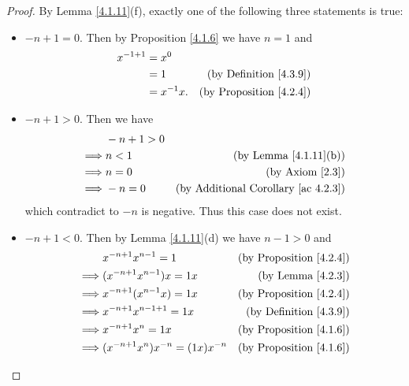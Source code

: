 \begin{proof}
    By Lemma \ref{4.1.11}(f), exactly one of the following three statements is true:
    \begin{itemize}
        \item \(-n + 1 = 0\).
              Then by Proposition \ref{4.1.6} we have \(n = 1\) and
              \begin{align*}
                  x^{-1 + 1} & = x^0                                             \\
                             & = 1         & \text{(by Definition \ref{4.3.9})}  \\
                             & = x^{-1} x. & \text{(by Proposition \ref{4.2.4})}
              \end{align*}
        \item \(-n + 1 > 0\).
              Then we have
              \begin{align*}
                           & -n + 1 > 0                                                   \\
                  \implies & n < 1      & \text{(by Lemma \ref{4.1.11}(b))}               \\
                  \implies & n = 0      & \text{(by Axiom \ref{2.3})}                     \\
                  \implies & -n = 0     & \text{(by Additional Corollary \ref{ac 4.2.3})}
              \end{align*}
              which contradict to \(-n\) is negative.
              Thus this case does not exist.
        \item \(-n + 1 < 0\).
              Then by Lemma \ref{4.1.11}(d) we have \(n - 1 > 0\) and
              \begin{align*}
                           & x^{-n + 1} x^{n - 1} = 1              & \text{(by Proposition \ref{4.2.4})} \\
                  \implies & (x^{-n + 1} x^{n - 1}) x = 1x         & \text{(by Lemma \ref{4.2.3})}       \\
                  \implies & x^{-n + 1} (x^{n - 1} x) = 1x         & \text{(by Proposition \ref{4.2.4})} \\
                  \implies & x^{-n + 1} x^{n - 1 + 1} = 1x         & \text{(by Definition \ref{4.3.9})}  \\
                  \implies & x^{-n + 1} x^n = 1x                   & \text{(by Proposition \ref{4.1.6})} \\
                  \implies & (x^{-n + 1} x^n) x^{-n} = (1x) x^{-n} & \text{(by Proposition \ref{4.1.6})} \\

\end{align*}
\end{itemize}
\end{proof}
